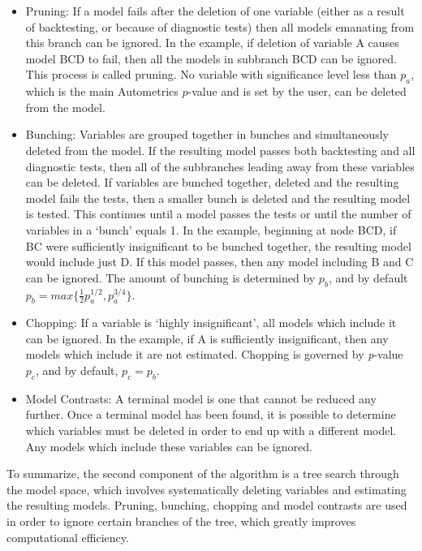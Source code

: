 \begin{itemize}
\item Pruning: If a model fails after the deletion of one variable (either as a result of backtesting, or because of diagnostic tests) then all models emanating from this branch can be ignored. In the example, if deletion of variable A causes model BCD to fail, then all the models in subbranch BCD can be ignored. This process is called pruning. No variable with significance level less than $p_{a}$, which is the main Autometrics $p$-value and is set by the user, can be deleted from the model.
\item Bunching:  Variables are grouped together in bunches and simultaneously deleted from the model. If the resulting model passes both backtesting and all diagnostic tests, then all of the subbranches leading away from these variables can be deleted. If variables are bunched together, deleted and the resulting model fails the tests, then a smaller bunch is deleted and the resulting model is tested. This continues until a model passes the tests or until the number of variables in a `bunch' equals 1. In the example, beginning at node BCD, if BC were sufficiently insignificant to be bunched together, the resulting model would include just D. If this model passes, then any model including B and C can be ignored. The amount of bunching is determined by $p_{b}$, and by default $p_{b} = max\{ \frac{1}{2}p_{a}^{1/2}, p_{a}^{3/4}\}$. 
\item Chopping: If a variable is `highly insignificant', all models which include it can be ignored. In the example, if A is sufficiently insignificant, then any models which include it are not estimated. Chopping is governed by \textit{p}-value $\mathit{p_{c}}$, and by default, $p_{c} = p_{b}$. 
\item Model Contrasts: A terminal model is one that cannot be reduced any further. Once a terminal model has been found, it is possible to determine which variables must be deleted in order to end up with a different model. Any models which include these variables can be ignored. 
\end{itemize}

To summarize, the second component of the algorithm is a tree search through the model space, which involves systematically deleting variables and estimating the resulting models. Pruning, bunching, chopping and model contrasts are used in order to ignore certain branches of the tree, which greatly improves computational efficiency. 

